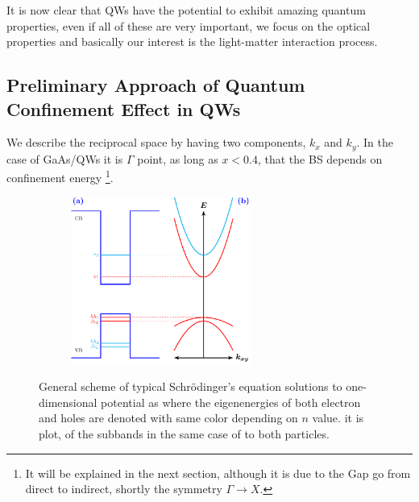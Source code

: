 It is  now clear  that  \gls{QW}s have the potential to exhibit amazing quantum properties, even if all of these are very important, we focus on the optical properties and basically our interest is the light-matter interaction process.  
 
\subsection{Preliminary Approach of Quantum Confinement Effect in QWs}
\label{subsection:chapter-1-preliminary-approach-of-quantum-confinment-effect-in-qws}
\vspace{-10mm} 
We describe the reciprocal space by having two components, $k_{x}$ and $k_{y}$. In the case of GaAs/\algaas \gls{QW}s it is $\Gamma$ point, as long as $x < 0.4$, that the \gls{BS} depends on confinement energy \footnote{It will be explained in the next section, although it is due to the Gap go from direct to indirect, shortly the symmetry $\Gamma\to X$.}.
\begin{figure}[t]
	\begin{subfigure}{\textwidth}
		\centering
		\includegraphics[width=0.65\textwidth]{../figures/chapter-1/heterostructures/out/qw2}
		\label{subfig:subsection-1.2-single-quantum-well-scheme2-a)}
		\label{subfig:subsection-1.2-single-quantum-well-scheme2-b)}
	\end{subfigure}
	\caption{General scheme of typical Schrödinger's equation solutions to one-dimensional potential as  where the eigenenergies of both electron and holes are denoted with same color depending on  $n$ value. it is plot, of the subbands in  the same case of   to both particles.  }
	\label{fig:subsection-1.2-single-quantum-well-scheme2}
\end{figure}
